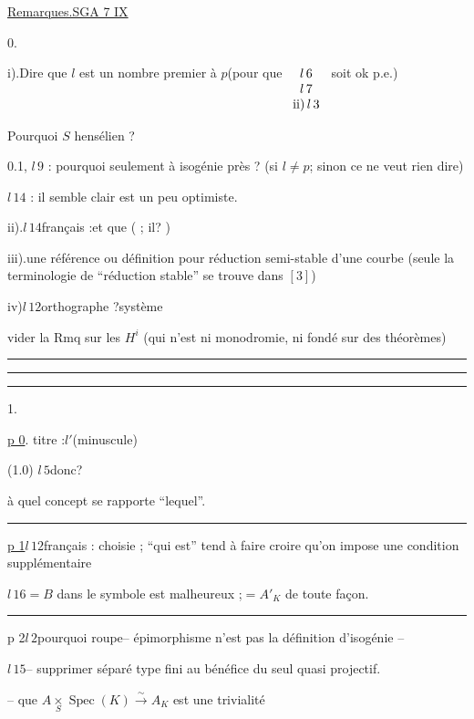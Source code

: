 
\uline{Remarques.\qquad SGA 7 IX}

0.

i).\quad Dire que $l$ est un nombre premier à $p$\quad (pour que $\begin{array}[t]{c}l\,6\\l\,7\\\mathrm{ii)}\,l\,3\end{array}$ soit ok p.e.)

Pourquoi $S$ hensélien ?

0.1, $l\,9$ : pourquoi seulement à isogénie près ? (si $l\ne p$;\deleted{\unsure{)}} sinon ce ne veut rien dire)

$l\,14$ : il semble clair \qquad est un peu optimiste.

ii).\quad $l\,14$\qquad français :\qquad et que \qquad ( ; il\qquad ? )

iii).\quad {}\qquad une référence ou définition pour réduction semi-stable d'une courbe (seule la terminologie de ``réduction stable'' se trouve dans $[3]$)

iv)\quad $l\,12$\qquad orthographe ?\qquad système

\qquad vider la Rmq sur les $H^i$ (qui n'est ni monodromie, ni fondé sur des théorèmes)

\hrule\smallskip\hrule\smallskip\hrule

1.

\uline{p 0}. titre :\qquad $l'$\quad (minuscule)

(1.0) $l\,5$\qquad donc\qquad ?

\qquad à quel concept se rapporte ``lequel''.

\hrule

\uline{p 1}\quad $l\,12$\qquad français : choisie \qquad ; ``qui est'' tend à faire croire qu'on impose une condition supplémentaire

$l\,16$\qquad $=B$ dans le symbole est malheureux ;\quad $=A'_K$ de toute façon.

\hrule

p 2\quad $l\,2$\qquad pourquoi roupe\qquad -- épimorphisme n'est pas la définition d'isogénie --

$l\,15$\qquad -- supprimer séparé type fini au bénéfice du seul quasi projectif.

-- que $A\mathbin{\mathop{\times}\limits_S}\operatorname{Spec}(K)\overset{\sim}{\longrightarrow}A_K$ est une trivialité
